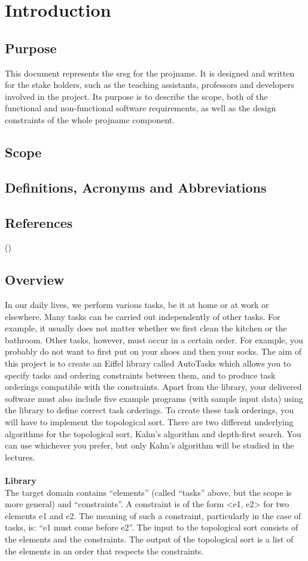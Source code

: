 \section{Introduction}
\subsection{Purpose}
This document represents the \gls{srsg} for the \gls{projname}. It is designed and written for the stake holders, such as the teaching assistants, professors and developers involved in the project. Its
purpose is to describe the scope, both of the functional and non-functional software requirements, as well as the design constraints of the whole \gls{projname} component.
\subsection{Scope}
\subsection{Definitions, Acronyms and Abbreviations}
\printglossary[type=\acronymtype]
\printglossary
\subsection{References}
(\cite{IEEE830:1998})

\subsection{Overview}
In our daily lives, we perform various tasks, be it at home or at work or elsewhere. Many tasks can be carried out independently of other tasks. For example, it usually does not matter whether we first clean the kitchen or the bathroom. Other tasks, however, must occur in a certain order.
For example, you probably do not want to first put on your shoes and then your socks. The aim of this project is to create an Eiffel library called AutoTasks which allows you to specify tasks and ordering constraints between them, and to produce task orderings compatible with the constraints. Apart from the library, your delivered software must also include five example programs (with sample input data) using the library to define correct task orderings.
To create these task orderings, you will have to implement the topological sort. There are two different underlying algorithms for the topological sort, Kahn’s algorithm and depth-first search. You
can use whichever you prefer, but only Kahn’s algorithm will be studied in the lectures.\\~\\
\textbf{Library}\\
The target domain contains “elements” (called “tasks” above, but the scope is more general) and “constraints”. A constraint is of the form <e1, e2> for two elements e1 and e2. The meaning of such a constraint, particularly in the case of tasks, is: “e1 must come before e2”. The input to the topological sort consists of the elements and the constraints. The output of the topological sort is a list of the elements in an order that respects the constraints.
